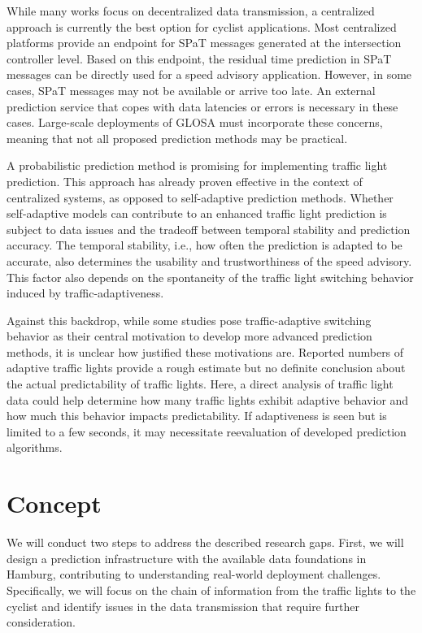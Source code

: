 \begin{Summary}
While many works focus on decentralized data transmission, a centralized approach is currently the best option for cyclist applications. Most centralized platforms provide an endpoint for SPaT messages generated at the intersection controller level. Based on this endpoint, the residual time prediction in SPaT messages can be directly used for a speed advisory application. However, in some cases, SPaT messages may not be available or arrive too late. An external prediction service that copes with data latencies or errors is necessary in these cases. Large-scale deployments of GLOSA must incorporate these concerns, meaning that not all proposed prediction methods may be practical.

A probabilistic prediction method is promising for implementing traffic light prediction. This approach has already proven effective in the context of centralized systems, as opposed to self-adaptive prediction methods. Whether self-adaptive models can contribute to an enhanced traffic light prediction is subject to data issues and the tradeoff between temporal stability and prediction accuracy. The temporal stability, i.e., how often the prediction is adapted to be accurate, also determines the usability and trustworthiness of the speed advisory. This factor also depends on the spontaneity of the traffic light switching behavior induced by traffic-adaptiveness.

Against this backdrop, while some studies pose traffic-adaptive switching behavior as their central motivation to develop more advanced prediction methods, it is unclear how justified these motivations are. Reported numbers of adaptive traffic lights provide a rough estimate but no definite conclusion about the actual predictability of traffic lights. Here, a direct analysis of traffic light data could help determine how many traffic lights exhibit adaptive behavior and how much this behavior impacts predictability. If adaptiveness is seen but is limited to a few seconds, it may necessitate reevaluation of developed prediction algorithms.
\end{Summary}

\section{Concept}

We will conduct two steps to address the described research gaps. First, we will design a prediction infrastructure with the available data foundations in Hamburg, contributing to understanding real-world deployment challenges. Specifically, we will focus on the chain of information from the traffic lights to the cyclist and identify issues in the data transmission that require further consideration. 

